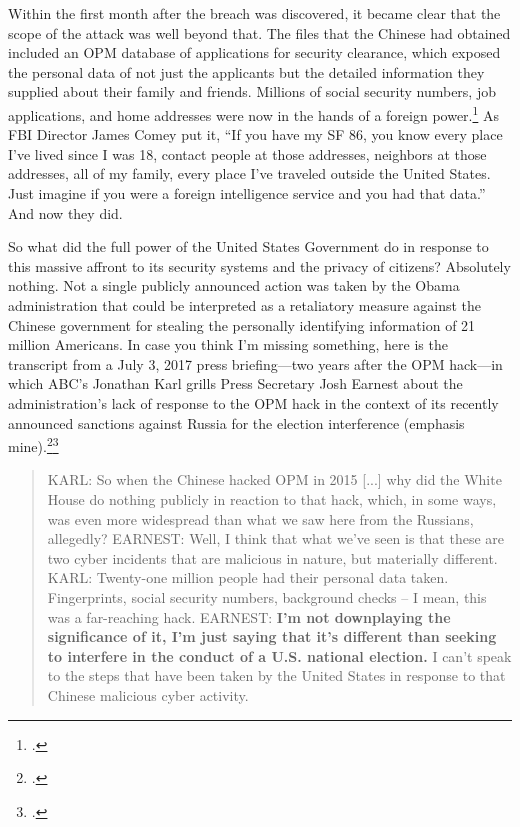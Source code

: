 \documentclass{report}
\begin{document}
\begin{refsegment}
Within the first month after the breach was discovered, it became clear that the scope of the attack was well beyond that. The files that the Chinese had obtained included an OPM database of applications for security clearance, which exposed the personal data of not just the applicants but the detailed information they supplied about their family and friends. Millions of social security numbers, job applications, and home addresses were now in the hands of a foreign power.\footcite{nakashima_hacks_2015} As FBI Director James Comey put it, ``If you have my SF 86, you know every place I've lived since I was 18, contact people at those addresses, neighbors at those addresses, all of my family, every place I've traveled outside the United States. Just imagine if you were a foreign intelligence service and you had that data.'' And now they did.

So what did the full power of the United States Government do in response to this massive affront to its security systems and the privacy of citizens? Absolutely nothing. Not a single publicly announced action was taken by the Obama administration that could be interpreted as a retaliatory measure against the Chinese government for stealing the personally identifying information of 21 million Americans.  In case you think I'm missing something, here is the transcript from a July 3, 2017 press briefing---two years after the OPM hack---in which ABC's Jonathan Karl grills Press Secretary Josh Earnest about the administration's lack of response to the OPM hack in the context of its recently announced sanctions against Russia for the election interference (emphasis mine).\footcite[Transcript adapted from the official White House website.]{earnest_press_2017}\footcite[The full exchange goes on for about 5 minutes, and you can watch the entire video here. It's pretty awkward.]{gill_earnest_2017}
\begin{quote}
KARL: So when the Chinese hacked OPM in 2015 [...] why did the White House do nothing publicly in reaction to that hack, which, in some ways, was even more widespread than what we saw here from the Russians, allegedly?
\newline \newline
EARNEST: Well, I think that what we've seen is that these are two cyber incidents that are malicious in nature, but materially different.
\newline \newline
KARL: Twenty-one million people had their personal data taken.  Fingerprints, social security numbers, background checks -- I mean, this was a far-reaching hack.
\newline \newline
EARNEST: \textbf{I'm not downplaying the significance of it, I'm just saying that it's different than seeking to interfere in the conduct of a U.S. national election.} I can't speak to the steps that have been taken by the United States in response to that Chinese malicious cyber activity.
\end{quote}


\end{refsegment}
\end{document}
